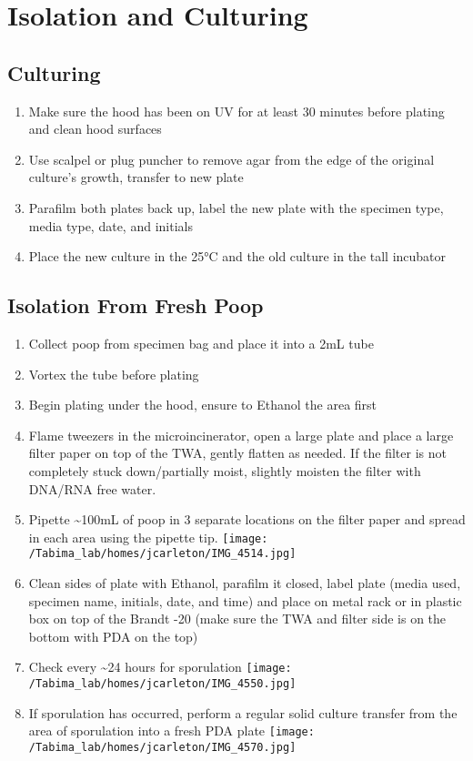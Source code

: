 \documentclass[
]{book}
\providecommand{\tightlist}{%
  \setlength{\itemsep}{0pt}\setlength{\parskip}{0pt}}
\begin{document}
\hypertarget{isolation-and-culturing}{%
\chapter{Isolation and Culturing}\label{isolation-and-culturing}}

\hypertarget{culturing}{%
\section{Culturing}\label{culturing}}

\begin{enumerate}
\def\labelenumi{\arabic{enumi}.}
\tightlist
\item
  Make sure the hood has been on UV for at least 30 minutes before plating and clean hood surfaces
\item
  Use scalpel or plug puncher to remove agar from the edge of the original culture's growth, transfer to new plate
\item
  Parafilm both plates back up, label the new plate with the specimen type, media type, date, and initials
\item
  Place the new culture in the 25°C and the old culture in the tall incubator
\end{enumerate}

\hypertarget{isolation-from-fresh-poop}{%
\section{Isolation From Fresh Poop}\label{isolation-from-fresh-poop}}

\begin{enumerate}
\def\labelenumi{\arabic{enumi}.}
\tightlist
\item
  Collect poop from specimen bag and place it into a 2mL tube
\item
  Vortex the tube before plating
\item
  Begin plating under the hood, ensure to Ethanol the area first
\item
  Flame tweezers in the microincinerator, open a large plate and place a large filter paper on top of the TWA, gently flatten as needed. If the filter is not completely stuck down/partially moist, slightly moisten the filter with DNA/RNA free water.
\item
  Pipette \textasciitilde100mL of poop in 3 separate locations on the filter paper and spread in each area using the pipette tip.
  \texttt{[image: /Tabima\_lab/homes/jcarleton/IMG\_4514.jpg]}
\item
  Clean sides of plate with Ethanol, parafilm it closed, label plate (media used, specimen name, initials, date, and time) and place on metal rack or in plastic box on top of the Brandt -20 (make sure the TWA and filter side is on the bottom with PDA on the top)
\item
  Check every \textasciitilde24 hours for sporulation
  \texttt{[image: /Tabima\_lab/homes/jcarleton/IMG\_4550.jpg]}
\item
  If sporulation has occurred, perform a regular solid culture transfer from the area of sporulation into a fresh PDA plate
  \texttt{[image: /Tabima\_lab/homes/jcarleton/IMG\_4570.jpg]}
\end{enumerate}
\end{document}
